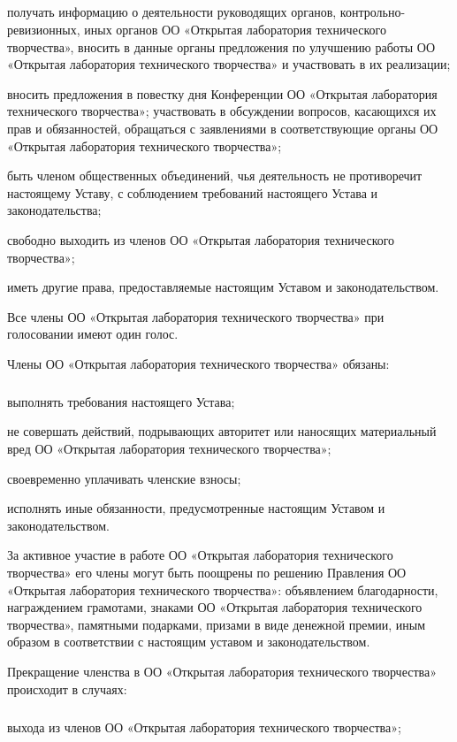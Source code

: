 \documentclass[a4paper,fontsize=14pt,titlepage]{scrartcl}
\makeatletter
\newenvironment{numberedpars}{%
  \addtocounter{secnumdepth}{1}
  \renewcommand\theparagraph{\arabic{section}.\arabic{paragraph}}
  \renewcommand\@seccntformat[1]
  {\expandafter\ifx\csname##1\endcsname\paragraph\csname 
  the##1\endcsname\else\csname the##1\endcsname\quad\fi}
  \let\old@par=\par
  \def\new@par{\let\par=\old@par\paragraph{}\let\par=\new@par}
  \let\par=\new@par
  \par
}{
  \addtocounter{secnumdepth}{-1}
}
\newenvironment{numberedsubpars}{%
  \addtocounter{secnumdepth}{1}
  \renewcommand\thesubparagraph{\arabic{section}.\arabic{paragraph}.\arabic{subparagraph}}
  \renewcommand\@seccntformat[1]
  {\expandafter\ifx\csname##1\endcsname\subparagraph\csname 
  the##1\endcsname\else\csname the##1\endcsname\quad\fi}
  \let\old@@par=\par
  \def\new@@par{\let\par=\old@par\subparagraph{}\let\par=\new@@par}
  \let\par=\new@@par
  \par
}{
  \addtocounter{secnumdepth}{-1}
  \let\par=\old@@par
}
\makeatother
\begin{document}
\begin{numberedpars}
\begin{numberedsubpars}
получать информацию о деятельности руководящих органов, контрольно-ревизионных, иных органов ОО «Открытая лаборатория
технического творчества», вносить в данные органы предложения по улучшению работы ОО «Открытая лаборатория технического
творчества» и участвовать в их реализации;

вносить предложения в повестку дня Конференции ОО «Открытая лаборатория технического творчества»;
участвовать в обсуждении вопросов, касающихся их прав и обязанностей, обращаться с заявлениями в соответствующие органы
ОО «Открытая лаборатория технического творчества»;

быть членом общественных объединений, чья деятельность не противоречит настоящему Уставу, с соблюдением требований
настоящего Устава и законодательства;

свободно выходить из членов ОО «Открытая лаборатория технического творчества»;

иметь другие права, предоставляемые настоящим Уставом и законодательством.
\end{numberedsubpars}

Все члены ОО «Открытая лаборатория технического творчества» при голосовании имеют один голос.

Члены ОО «Открытая лаборатория технического творчества» обязаны:
\begin{numberedsubpars}
выполнять требования настоящего Устава;

не совершать действий, подрывающих авторитет или наносящих материальный вред ОО «Открытая лаборатория технического
творчества»;

своевременно уплачивать членские взносы;

исполнять иные обязанности, предусмотренные настоящим Уставом и законодательством.
\end{numberedsubpars}

За активное участие в работе ОО «Открытая лаборатория технического творчества» его члены могут быть поощрены по решению
Правления ОО «Открытая лаборатория технического творчества»: объявлением благодарности, награждением грамотами, знаками
ОО «Открытая лаборатория технического творчества», памятными подарками, призами в виде денежной премии, иным образом в
соответствии с настоящим уставом и законодательством.

Прекращение членства в ОО «Открытая лаборатория технического творчества» происходит в случаях:
\begin{numberedsubpars}
выхода из членов ОО «Открытая лаборатория технического творчества»;


\end{numberedsubpars}
\end{numberedpars}
\end{document}
